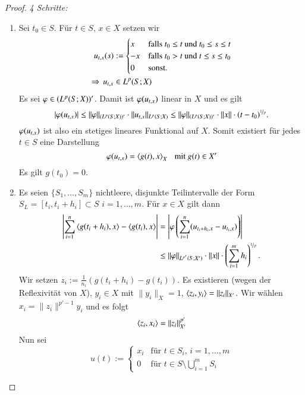 \begin{proof}
    \textit{4 Schritte:}
    \begin{enumerate}
        \item %
        Sei $t_0\in S$. Für $t\in S$, $x\in X$ setzen wir
        \begin{align*}
            u_{t,x}(s) &:= \begin{cases} x & \text{falls $t_0\leq t$ und $t_0\leq s \leq t$}\\
                        -x & \text{falls $t_0>t$ und $t\leq s \leq t_0$} \\
                        0 & \text{sonst}.\end{cases}\\
            \Rightarrow \, u_{t,x} &\in L^p (S;X)
        \end{align*}
        Es sei $\varphi\in (L^p(S;X))'$. Damit ist $\varphi(u_{t,x})$ linear in $X$ und es gilt
        \[
            |\varphi(u_{t,x})|\leq \|\varphi\|_{(L^p(S;X))'} \cdot\|u_{t,x}\|_{L^p(S;X)} \leq \|\varphi\|
            _{(L^p(S;X))'} \cdot \|x\|\cdot (t-t_0)^{\nicefrac1p}.
        \]
        $\varphi(u_{t,x})$ ist also ein stetiges lineares Funktional auf $X$. Somit existiert für jedes
        $t\in S$ eine Darstellung
        \[
            \varphi(u_{t,x})= \left\langle g(t),x\right\rangle _X \hspace{.25cm} \text{mit } g(t)\in X'
        \]
        Es gilt $g(t_0)=0$.
        \item %
        Es seien $\{S_1,…,S_m\}$ nichtleere, disjunkte Teilintervalle der Form $S_L=[t_i,t_i+h_i]\subset
        S$ $i=1,…,m$. Für $x\in X$ gilt dann
        \begin{align*}
            \left|\sum_{i=1}^n\left\langle g(t_i+h_i),x\right\rangle-\left\langle g(t_i),x\right\rangle\right|&= \left| \varphi
            \left( \sum_{i=1}^n (u_{t_i+h_i,x}-u_{t_i,x}) \right) \right|\\
                &\leq \|\varphi\|_{L^{p'}(S;X')}\cdot\|x\|\cdot\left(\sum_{i=1}^m h_i\right)^{\nicefrac1p}.
        \end{align*}
        Wir setzen $z_i:= \frac{1}{n_i}(g(t_i+h_i)-g(t_i))$. Es existieren (wegen der Reflexivität von
        $X$), $y_i\in X$ mit $\|y_i\|_X=1$, $\left\langle z_i,y_i\right\rangle = \|z_i\|_{X'}$. Wir wählen
        $x_i=\|z_i\|^{p'-1} y_i$ und es folgt
        \[
            \left\langle z_i,x_i \right\rangle = \|z_i\|^{p'}_{X'}
        \]
        Nun sei
        \[
            u(t):= \begin{cases} x_i & \text{für $t\in S_i$, $i=1,…,m$} \\
                   0 & \text{für } t\in S\setminus\bigcup_{i=1}^m S_i\end{cases}
\]
\end{enumerate}
\end{proof}
